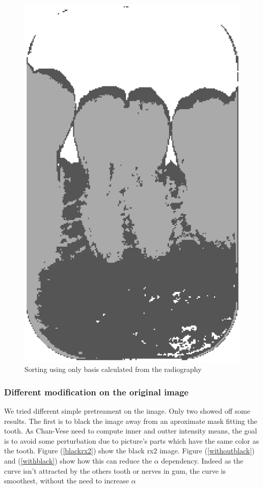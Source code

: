 \begin{figure}[H]
\centering
\includegraphics[scale=0.3]{images/testDentPCA.eps}
\caption{Sorting using only basis calculated from the radiography}
\label{testDentPCA}
\end{figure}

\subsubsection*{Different modification on the original image}

We tried different simple pretreament on the image.
Only two showed off some results.
The first is to black the image away from an aproximate mask fitting the tooth. As Chan-Vese need to compute inner and outter intensity means, the goal is to avoid some perturbation due to picture's parts which have the same color as the tooth. Figure (\ref{blackrx2}) show the black rx2 image. Figure (\ref{withoutblack}) and  (\ref{withblack}) show how this can reduce the $\alpha$ dependency. Indeed as the curve isn't attracted by the others tooth or nerves in gum, the curve is smoothest, without the need to increase $\alpha$

